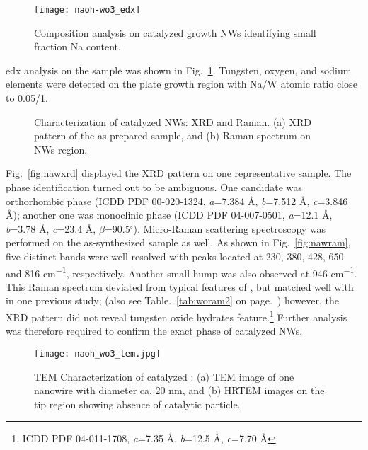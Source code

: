 \begin{figure}[htb]
\centering
\texttt{[image: naoh-wo3\_edx]}
\caption[Composition analysis on  catalyzed  growth NWs]{Composition analysis on  catalyzed  growth NWs identifying small fraction Na content.}
\label{fig:naohwedx}
\end{figure}
\gls{edx} analysis on the   sample was shown in Fig.~\ref{fig:naohwedx}. Tungsten, oxygen, and sodium elements were detected on the plate growth region with Na/W atomic ratio close to 0.05/1. 
\begin{figure}[htb]
\centering
{}\hspace{0.04\textwidth}
\caption[Characterization of  catalyzed  NWs: XRD and Raman]{Characterization of  catalyzed  NWs: XRD and Raman. (a) XRD pattern of the as-prepared sample, and (b) Raman spectrum on NWs region.}
\label{fig:naohwxrd}
\end{figure}
Fig.~\ref{fig:nawxrd} displayed the XRD pattern on one representative sample. The phase identification turned out to be ambiguous. One candidate was orthorhombic  phase (ICDD PDF 00-020-1324, \emph{a}=7.384 \si{\angstrom}, \emph{b}=7.512 \si{\angstrom}, \emph{c}=3.846 \si{\angstrom}); another one was monoclinic  phase (ICDD PDF 04-007-0501, \emph{a}=12.1 \si{\angstrom}, \emph{b}=3.78 \si{\angstrom}, \emph{c}=23.4 \si{\angstrom}, $\beta$=90.5$^\circ$). Micro-Raman scattering spectroscopy was performed on the as-synthesized sample as well. As shown in Fig.~\ref{fig:nawram}, five distinct bands were well resolved with peaks located at 230, 380, 428, 650 and 816 \si{cm^{-1}}, respectively. Another small hump was also observed at 946 \si{cm^{-1}}. This Raman spectrum deviated from typical features of ,\cite{Salje1975a,Dixit1986} but matched well with  in one previous study;\cite{Daniel1987} (also see Table.~\ref{tab:woram2} on page.~\pageref{tab:woram2}) however, the XRD pattern did not reveal tungsten oxide hydrates feature.\footnote{ICDD PDF 04-011-1708, \emph{a}=7.35 \si{\angstrom}, \emph{b}=12.5 \si{\angstrom}, \emph{c}=7.70 \si{\angstrom}} Further analysis was therefore required to confirm the exact phase of  catalyzed  NWs.\cite{Azimirad2009a} 

\begin{figure}[htb]
\centering
\texttt{[image: naoh\_wo3\_tem.jpg]}
\caption[Characterization of  catalyzed : TEM]{TEM Characterization of  catalyzed : (a) TEM image of one nanowire with diameter ca. 20 nm, and (b) HRTEM images on the tip region showing absence of catalytic particle.}
\label{fig:naohwtem}
\end{figure}

